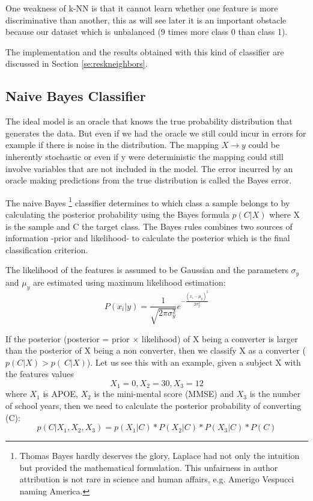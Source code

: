 \documentclass[11pt]{article}
\theoremstyle{definition}
\theoremstyle{remark}
\begin{document}
One weakness of k-NN  is that it cannot learn whether one feature is more discriminative than another, this as will see later it is an important obstacle because our dataset which is unbalanced (9 times more class 0 than class 1).

The implementation and the results obtained with this kind of classifier are discussed in Section \ref{se:reskneighbors}.

\subsection{Naive Bayes Classifier}
\label{sse:naivebayes}

The ideal model is an oracle that knows the true probability distribution that generates the data. But even if we had the oracle we still could incur in errors for example if there is noise in the distribution.
The mapping $X \to y$ could be inherently stochastic or even if y were deterministic the mapping could still involve variables that are not included in the model. The error incurred by an oracle making predictions from the true distribution is called the Bayes error.

The naive Bayes \footnote{Thomas Bayes hardly deserves the glory, Laplace had not only the intuition but provided the mathematical formulation. This unfairness in author attribution is not rare in science and human affairs, e.g. Amerigo Vespucci naming America.} classifier determines to which class a sample belongs to by calculating the posterior probability using the Bayes formula $p(C|X)$ where X is the sample and C the target class.
The Bayes rules combines two sources of information -prior and likelihood- to calculate the posterior which is the final classification criterion. 

The likelihood of the features is assumed to be Gaussian and the parameters $\sigma_y$ and $\mu_y$ are estimated using maximum likelihood estimation:
\begin{equation} 
P(x_i|y)= \frac{1}{\sqrt{2\pi\sigma_y^{2}}}e^{-\frac{(x_i-\mu_y)^2}{2\sigma_y^2}}
\label{eq:naiveb}
\end{equation}

If the posterior (posterior = prior $\times$ likelihood) of X being a converter is larger than the posterior of X being a non converter, then we classify X as a converter ($p(C|X) > p(~C|X)$). Let us see this with an example, given a subject X with the features values 
\begin{equation*}
X_1 = 0, X_2=30, X_3=12
\end{equation*}
where $X_1$ is APOE, $X_2$ is the mini-mental score (MMSE) and $X_3$ is the number of school years, then we need to calculate the 
posterior probability of converting (C):
\begin{equation*}
p(C|X_1,X_2,X_3) = p(X_1|C) * P(X_2|C) * P(X_3|C) * P(C)
\end{equation*}
\end{document}
